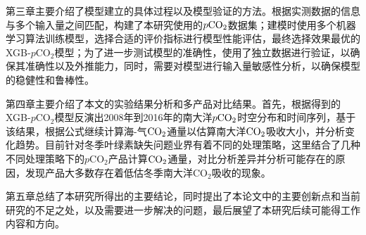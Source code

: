 第三章主要介绍了模型建立的具体过程以及模型验证的方法。根据实测数据的信息与多个输入量之间匹配，构建了本研究使用的$p\rm CO_2$数据集；建模时使用多个机器学习算法训练模型，选择合适的评价指标进行模型性能评估，最终选择效果最优的XGB-$p\mathrm{CO_2}$模型；为了进一步测试模型的准确性，使用了独立数据进行验证，以确保其准确性以及外推能力，同时，需要对模型进行输入量敏感性分析，以确保模型的稳健性和鲁棒性。

第四章主要介绍了本文的实验结果分析和多产品对比结果。首先，根据得到的XGB-$p\mathrm{CO_2}$模型反演出2008年到2016年的南大洋$p\rm CO_2$时空分布和时间序列，基于该结果，根据公式继续计算海-气$\rm CO_2$通量以估算南大洋$\rm CO_2$吸收大小，并分析变化趋势。目前针对冬季叶绿素缺失问题业界有着不同的处理策略，这里结合了几种不同处理策略下的$p\mathrm{CO_2}$产品计算$\rm CO_2$通量，对比分析差异并分析可能存在的原因，发现产品大多数存在着低估冬季南大洋$\mathrm{CO_2}$吸收的现象。

第五章总结了本研究所得出的主要结论，同时提出了本论文中的主要创新点和当前研究的不足之处，以及需要进一步解决的问题，最后展望了本研究后续可能得工作内容和方向。